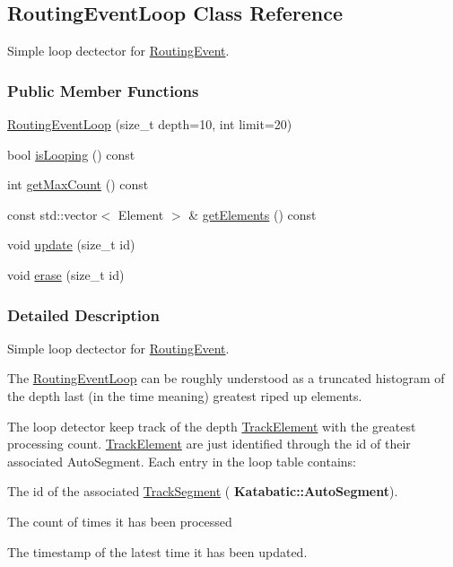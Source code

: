 \hypertarget{classKite_1_1RoutingEventLoop}{}\subsection{Routing\+Event\+Loop Class Reference}
\label{classKite_1_1RoutingEventLoop}


Simple loop dectector for \hyperlink{classKite_1_1RoutingEvent}{Routing\+Event}.  


\subsubsection*{Public Member Functions}
\begin{DoxyCompactItemize}
\item 
\hyperlink{classKite_1_1RoutingEventLoop_aa33efa06ccc2175e35eff7ac6dadffb6}{Routing\+Event\+Loop} (size\+\_\+t depth=10, int limit=20)
\item 
bool \hyperlink{classKite_1_1RoutingEventLoop_a78155a2b0119ac92d377fa404e348a98}{is\+Looping} () const
\item 
int \hyperlink{classKite_1_1RoutingEventLoop_a5744f7f01d26947fb0765bc5d1e2c3bd}{get\+Max\+Count} () const
\item 
const std\+::vector$<$ Element $>$ \& \hyperlink{classKite_1_1RoutingEventLoop_a7411a9e20edba3f3eeceb237dec86ff3}{get\+Elements} () const
\item 
void \hyperlink{classKite_1_1RoutingEventLoop_ad684b7c05480897bdbd86a5fb8363c72}{update} (size\+\_\+t id)
\item 
void \hyperlink{classKite_1_1RoutingEventLoop_a9b6582ce996327c65bf532396ca11b61}{erase} (size\+\_\+t id)
\end{DoxyCompactItemize}


\subsubsection{Detailed Description}
Simple loop dectector for \hyperlink{classKite_1_1RoutingEvent}{Routing\+Event}. 

The \hyperlink{classKite_1_1RoutingEventLoop}{Routing\+Event\+Loop} can be roughly understood as a truncated histogram of the {\ttfamily depth} last (in the time meaning) greatest riped up elements.

The loop detector keep track of the {\ttfamily depth} \hyperlink{classKite_1_1TrackElement}{Track\+Element} with the greatest processing count. \hyperlink{classKite_1_1TrackElement}{Track\+Element} are just identified through the {\ttfamily id} of their associated Auto\+Segment. Each entry in the loop table contains\+:
\begin{DoxyItemize}
\item The {\ttfamily id} of the associated \hyperlink{classKite_1_1TrackSegment}{Track\+Segment} (\textbf{ Katabatic\+::\+Auto\+Segment}).
\item The {\ttfamily count} of times it has been processed
\item The {\ttfamily timestamp} of the latest time it has been updated.
\end{DoxyItemize}

